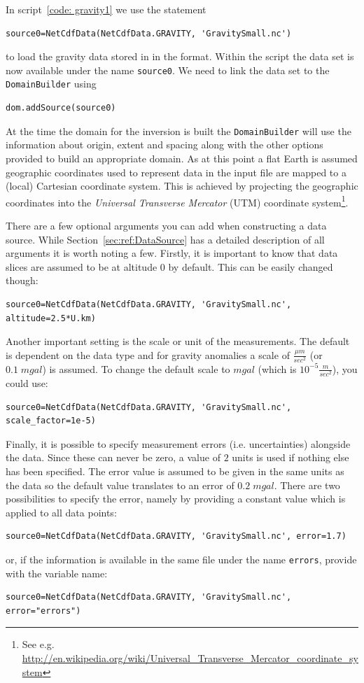 In script~\ref{code: gravity1} we use the statement 
\begin{verbatim}
source0=NetCdfData(NetCdfData.GRAVITY, 'GravitySmall.nc')
\end{verbatim}
to load the gravity data stored in  in the
\netcdf format. 
Within the script the data set is now available under the name \verb|source0|.
We need to link the data set to the \verb|DomainBuilder| using 
\begin{verbatim}
dom.addSource(source0)
\end{verbatim}
At the time the domain for the inversion is built the \verb|DomainBuilder|
will use the information about origin, extent and spacing along with the other
options provided to build an appropriate domain.
As at this point a flat Earth is assumed geographic coordinates used to
represent data in the input file are mapped to a (local) Cartesian coordinate
system. This is achieved by projecting the geographic coordinates into the
\emph{Universal Transverse Mercator} (UTM) coordinate system\footnote{See e.g.
\url{http://en.wikipedia.org/wiki/Universal_Transverse_Mercator_coordinate_system}}.

There are a few optional arguments you can add when constructing a data source.
While Section~\ref{sec:ref:DataSource} has a detailed description of all
arguments it is worth noting a few.
Firstly, it is important to know that data slices are assumed to be at altitude
$0$ by default. This can be easily changed though:
\begin{verbatim}
source0=NetCdfData(NetCdfData.GRAVITY, 'GravitySmall.nc', altitude=2.5*U.km)
\end{verbatim}
Another important setting is the scale or unit of the measurements.
The default is dependent on the data type and for gravity anomalies a scale
of $\frac{\mu m}{sec^2}$ (or $0.1 \; mgal$) is assumed.
To change the default scale to $mgal$ (which is $10^{-5} \frac{m}{sec^2}$),
you could use:
\begin{verbatim}
source0=NetCdfData(NetCdfData.GRAVITY, 'GravitySmall.nc', scale_factor=1e-5)
\end{verbatim}
Finally, it is possible to specify measurement errors (i.e. uncertainties)
alongside the data.
Since these can never be zero, a value of $2$ units is used if nothing else
has been specified.
The error value is assumed to be given in the same units as the data so the
default value translates to an error of $0.2 \; mgal$.
There are two possibilities to specify the error, namely by providing a
constant value which is applied to all data points:
\begin{verbatim}
source0=NetCdfData(NetCdfData.GRAVITY, 'GravitySmall.nc', error=1.7)
\end{verbatim}
or, if the information is available in the same \netcdf file under the name
\verb|errors|, provide \downunder with the variable name:
\begin{verbatim}
source0=NetCdfData(NetCdfData.GRAVITY, 'GravitySmall.nc', error="errors")
\end{verbatim}


